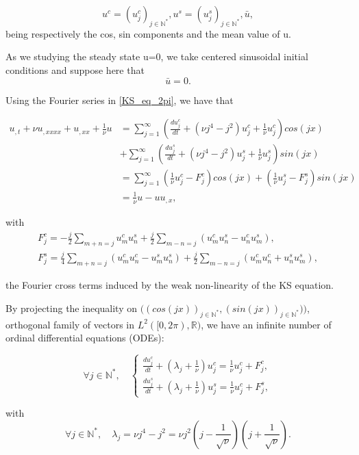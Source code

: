 \documentclass[12pt]{article}
\begin{document}
$$u^c=(u_j^c)_{j\in \mathbb{N}^*}, u^s= (u_j^s)_{j\in\mathbb{N}^*}, \bar{u},$$ being respectively the cos, sin components and the mean value 
of u. 

As we studying the steady state u=0, we take centered sinusoidal initial conditions and suppose here that $$\bar{u}=0.$$


Using the Fourier series in \eqref{KS_eq_2pi}, we have that

\begin{align*}
  u_{,t}  + \nu u_{,xxxx} + u_{,xx} + \frac{1}{\nu}u &= \sum_{j=1}^{\infty} (\frac{du_j^c}{dt} + (\nu j^4 - j^2)u_j^c +\frac{1}{\nu}u_j^c)cos(jx) \\ &+ \sum_{j=1}^{\infty}(\frac{du_j^s}{dt} + (\nu j^4 - j^2)u_j^s +\frac{1}{\nu}u_j^s)sin(jx)\\ &= \sum_{j=1}^{\infty} (\frac{1}{\nu}u_j^c- F_j^c)cos(jx)  +(\frac{1}{\nu}u_j^s- F_j^s)sin(jx) \\ &= \frac{1}{\nu}u - uu_{,x},
\end{align*}

with 
\begin{align*}
F_j^c = -\frac{j}{2} \sum_{m+n=j}u_m^cu_n^s + \frac{j}{2} \sum_{m-n=j}(u_m^cu_n^s - u_n^cu_m^s), \\
F_j^s = \frac{j}{4} \sum_{m+n=j}(u_m^cu_n^c - u_m^su_n^s)+ \frac{j}{2} \sum_{m-n=j}(u_m^cu_n^c + u_n^su_m^s),
\end{align*}

the Fourier cross terms induced by the weak non-linearity of the KS equation. 

By projecting the inequality on $\Big((cos(jx))_{j\in \mathbb{N}^*}, (sin(jx))_{j \in \mathbb{N}^*}) \Big)$, orthogonal 
family of vectors in $L^2([0,2\pi), \mathbb{R})$, we have an infinite number of ordinal differential equations (ODEs): 

\begin{equation}\label{ODE_KS}
    \forall j \in \mathbb{N}^*,\quad 
    \left\{
    \begin{aligned}
        \frac{du_j^c}{dt} + (\lambda_j + \frac{1}{\nu})u_j^c = \frac{1}{\nu}u_j^c + F_j^c, \\
        \frac{du_j^s}{dt} + (\lambda_j + \frac{1}{\nu})u_j^s = \frac{1}{\nu}u_j^c + F_j^s,
    \end{aligned}
    \right.
\end{equation}

with 
\begin{equation}
    \forall j\in \mathbb{N}^*, \quad \lambda_j = \nu j^4 - j^2 = \nu j^2(j-\frac{1}{\sqrt{\nu}})(j+\frac{1}{\sqrt{\nu}}).
\end{equation}
\end{document}

